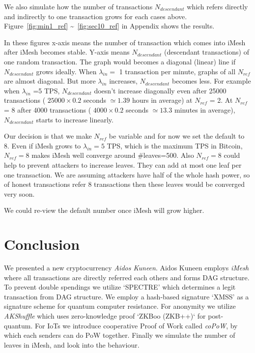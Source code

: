 \documentclass[a4paper,10pt,twocolumn]{article}
\begin{document}
	 We also simulate how the number of  transactions \( N_{descendant} \) which refers directly and indirectly to one transaction grows 
	 for each cases above. Figure~\ref{fig:min1_ref} \textasciitilde~\ref{fig:sec10_ref} in Appendix shows the results.
	 
	 In these figures x-axis means the number of transaction which comes into iMesh
	 after iMesh becomes stable. Y-axis means \( N_{descendant} \) 
	 (descendant transactions) of one random transaction. The graph would becomes a diagonal (linear) line if \( N_{descendant} \) grows ideally.
	 When  \( \lambda_{in}=\) 1 transaction per minute,   graphs of all \( N_{ref}\) are almost diagonal.
	 But more  \( \lambda_{in}\) increases,  \( N_{descendant} \) becomes less.
	 For example when  \( \lambda_{in}\) =5 TPS,  \( N_{descendant} \) 
	 doesn't increase diagonally even after  25000 transactions  ( \( 25000 \times 0.2\) seconds \(\simeq 1.39 \) hours in average) at \( N_{ref} \)  = 2.
At \( N_{ref}\) = 8 after  4000 transactions  ( \( 4000 \times 0.2\) seconds \(\simeq 13.3 \) minutes in average),
 \( N_{descendant} \) starts to increase linearly.


	 Our decision is that we make \( N_{ref}\) be variable and
	 for now we set the default to 8. 
	 Even if iMesh grows to  \( \lambda_{in}=5\) TPS, which is the maximum TPS
	 in Bitcoin,  \( N_{ref}=8\) makes iMesh well converge around \#leaves=500. 
	 Also \( N_{ref}=8\)  could
	 help to prevent attackers to increase leaves.
	 They can add at most one leaf per one transaction.  We are assuming attackers have half of the whole hash power, so 
	 of honest transactions refer 8 transactions then 
	 these leaves would be converged very soon.

 	 We could re-view the default number once iMesh will grow higher.

	  \section{Conclusion}
\label{sec:conc}

We presented  a new cryptocurrency \emph{Aidos Kuneen}.
Aidos Kuneen employs \emph{iMesh} where all transactions are directly referred each others and forms  DAG structure.
To prevent  double spendings we utilize `SPECTRE' which determines a legit transaction from DAG structure.
We employ a hash-based signature `XMSS' as a signature scheme for quantum computer resistance.
For anonymity we utilize \emph{AKShuffle} which uses zero-knowledge proof `ZKBoo (ZKB++)` for post-quantum.
For IoTs we introduce cooperative Proof of Work called \emph{coPoW}, by which each senders can do PoW together.
Finally we simulate the number of leaves in iMesh, and look into the behaviour.
\end{document}
